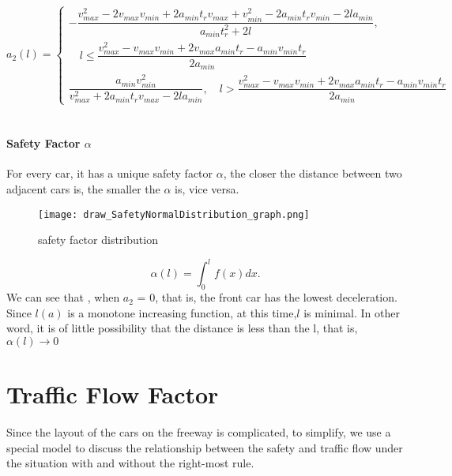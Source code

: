 \[ a_2(l) = \begin{cases}
-\dfrac{v_{max}^2 - 2v_{max}v_{min} + 2a_{min}t_rv_{max} + v_{min}^2 - 2a_{min}t_rv_{min} - 2la_{min}}{a_{min}t_r^2 + 2l}, 
\\

\quad l \leq \dfrac{v_{max}^2 - v_{max}v_{min} + 2v_{max}a_{min}t_r - a_{min} v_{min}t_r}{2a_{min}}\\
\dfrac{a_{min}v_{min}^2}{v_{max}^2 + 2a_{min}t_rv_{max} - 2la_{min}}, \quad  l > \dfrac{v_{max}^2 - v_{max}v_{min} + 2v_{max}a_{min}t_r - a_{min} v_{min}t_r}{2a_{min}}
\end{cases}\]
\\

\paragraph{Safety Factor $\alpha$}
For every car, it has a unique safety factor $\alpha$, the 
closer the distance between two adjacent cars is, the smaller 
the $\alpha$ is, vice versa.\\

\begin{figure}[h]
\small
\centering
\texttt{[image: draw\_SafetyNormalDistribution\_graph.png]}
\caption{safety factor distribution} \label{fig: safety factor distribution}
\end{figure}
\begin{displaymath}
\alpha(l) = \int_{0}^{l} f(x) dx.
\end{displaymath}
We can see that , when $a_2$ = 0, that is, the front car 
has the lowest deceleration. Since $l(a)$ is a monotone 
increasing function, at this time,$l$ is minimal. In other 
word, it is of little possibility that the distance is less 
than the l, that is, $\alpha(l) \rightarrow 0$                     


\section{Traffic Flow Factor}\label{sec: Traffic Flow Factor}
Since the layout of the cars on the freeway is complicated, 
to simplify, we use a special model to discuss the 
relationship between the safety and traffic flow under the 
situation with and without the right-most rule.
\\
